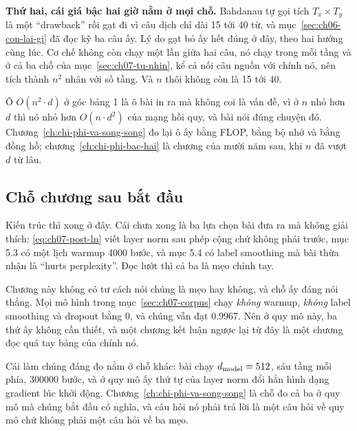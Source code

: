 \textbf{Thứ hai, cái giá bậc hai giờ nằm ở mọi chỗ.} Bahdanau tự gọi tích
\(T_x \times T_y\) là một \enquote{drawback} rồi gạt đi vì câu dịch chỉ dài 15
tới 40 từ, và mục~\ref{sec:ch06-con-lai-gi} đã đọc kỹ ba câu ấy. Lý do gạt bỏ
ấy hết đúng ở đây, theo hai hướng cùng lúc. Cơ chế không còn chạy một lần giữa
hai câu, nó chạy trong mỗi tầng và ở cả ba chỗ của
mục~\ref{sec:ch07-tu-nhin}, kể cả nối câu nguồn với chính nó, nên tích thành
\(n^2\) nhân với số tầng. Và \(n\) thôi không còn là 15 tới 40.

Ô \(O(n^2 \cdot d)\) ở góc bảng 1 là ô bài in ra mà không coi là vấn đề, vì ở
\(n\) nhỏ hơn \(d\) thì nó nhỏ hơn \(O(n \cdot d^2)\) của mạng hồi quy, và bài
nói đúng chuyện đó. Chương~\ref{ch:chi-phi-va-song-song} đo lại ô ấy bằng FLOP,
bằng bộ nhớ và bằng đồng hồ; chương~\ref{ch:chi-phi-bac-hai} là chương của mười
năm sau, khi \(n\) đã vượt \(d\) từ lâu.

\subsection*{Chỗ chương sau bắt đầu}

Kiến trúc thì xong ở đây. Cái chưa xong là ba lựa chọn bài đưa ra mà không giải
thích: \eqref{eq:ch07-post-ln} viết layer norm sau phép cộng chứ không phải
trước, mục 5.3 có một lịch warmup 4000 bước, và mục 5.4 có label smoothing mà
bài thừa nhận là \enquote{hurts perplexity}. Đọc lướt thì cả ba là mẹo chỉnh
tay.

Chương này không có tư cách nói chúng là mẹo hay không, và chỗ ấy đáng nói
thẳng. Mọi mô hình trong mục~\ref{sec:ch07-corpus} chạy \emph{không} warmup,
\emph{không} label smoothing và dropout bằng 0, và chúng vẫn đạt 0.9967. Nên ở
quy mô này, ba thứ ấy không cần thiết, và một chương kết luận ngược lại từ đây
là một chương đọc quá tay bảng của chính nó.

Cái làm chúng đáng đo nằm ở chỗ khác: bài chạy \(d_{\mathrm{model}} = 512\), sáu tầng mỗi
phía, 300000 bước, và ở quy mô ấy thứ tự của layer norm đổi hẳn hình dạng
gradient lúc khởi động. Chương~\ref{ch:chi-phi-va-song-song} là chỗ đo cả ba ở
quy mô mà chúng bắt đầu có nghĩa, và câu hỏi nó phải trả lời là một câu hỏi về
quy mô chứ không phải một câu hỏi về ba mẹo.
